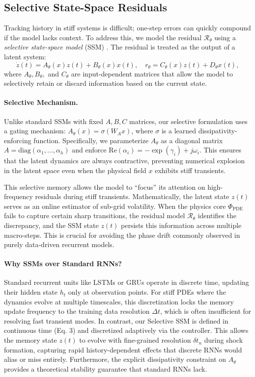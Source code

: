 \documentclass{article}
\theoremstyle{plain}
\theoremstyle{definition}
\theoremstyle{remark}
\begin{document}
\subsection{Selective State-Space Residuals}

Tracking history in stiff systems is difficult; one-step errors can quickly compound if the model lacks context. To address this, we model the residual $\mathcal{R}_\theta$ using a \emph{selective state-space model} (SSM) \cite{gu2023mamba}. The residual is treated as the output of a latent system:
\begin{equation}
  \dot{z}(t) = A_\theta(x) z(t) + B_\theta(x) x(t), \quad r_\theta = C_\theta(x) z(t) + D_\theta x(t),
\end{equation}
where $A_\theta, B_\theta,$ and $C_\theta$ are input-dependent matrices that allow the model to selectively retain or discard information based on the current state.

\paragraph{Selective Mechanism.}
Unlike standard SSMs with fixed $A, B, C$ matrices, our selective formulation uses a gating mechanism: $A_\theta(x) = \sigma(W_A x)$, where $\sigma$ is a learned dissipativity-enforcing function. Specifically, we parameterize $A_\theta$ as a diagonal matrix $A = \text{diag}(\alpha_1, \dots, \alpha_h)$ and enforce $\text{Re}(\alpha_i) = -\exp(\gamma_i) + j \omega_i$. This ensures that the latent dynamics are always contractive, preventing numerical explosion in the latent space even when the physical field $x$ exhibits stiff transients. 

This selective memory allows the model to ``focus'' its attention on high-frequency residuals during stiff transients. Mathematically, the latent state $z(t)$ serves as an online estimator of sub-grid volatility. When the physics core $\Phi_{\text{PDE}}$ fails to capture certain sharp transitions, the residual model $\mathcal{R}_\theta$ identifies the discrepancy, and the SSM state $z(t)$ persists this information across multiple macro-steps. This is crucial for avoiding the phase drift commonly observed in purely data-driven recurrent models.

\paragraph{Why SSMs over Standard RNNs?}
Standard recurrent units like LSTMs or GRUs operate in discrete time, updating their hidden state $h_t$ only at observation points. For stiff PDEs where the dynamics evolve at multiple timescales, this discretization locks the memory update frequency to the training data resolution $\Delta t$, which is often insufficient for resolving fast transient modes. In contrast, our Selective SSM is defined in continuous time (Eq. 3) and discretized adaptively via the controller. This allows the memory state $z(t)$ to evolve with fine-grained resolution $\delta t_n$ during shock formation, capturing rapid history-dependent effects that discrete RNNs would alias or miss entirely. Furthermore, the explicit dissipativity constraint on $A_\theta$ provides a theoretical stability guarantee that standard RNNs lack.
\end{document}

